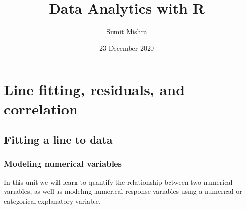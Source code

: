 \documentclass[notes,11pt, aspectratio=169]{beamer}
\title[DAR]{Data Analytics with R}  %
\author{Sumit Mishra} %
\institute[IFMR] %
{
  Institute for Financial Management and Research, Sri City \\ %
  \medskip
  \medskip
  \textbf{Linear Regression} %
}
\date{23 December 2020} %
\begin{document}

  
 {
    \addtocounter{framenumber}{-1} 
    {\removepagenumbers 
      \begin{frame}
      
      
      \titlepage
      
      \end{frame}
    }
  }






\section{Line fitting, residuals, and correlation}


\subsection{Fitting a line to data}


\begin{frame}
\frametitle{Modeling numerical variables}

In this unit we will learn to quantify the relationship between two numerical variables, as well as modeling numerical response variables using a numerical or categorical explanatory variable.

\end{frame}

\end{document}
